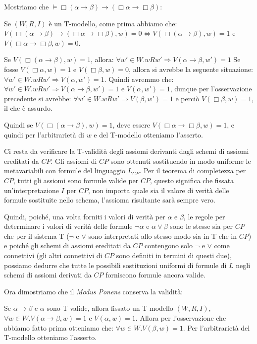 \documentclass[a4paper, titlepage, 12pt]{report}
\begin{document}
\begin{flushleft}
Mostriamo che $\vDash \Box (\alpha \rightarrow \beta) \rightarrow (\Box \alpha \rightarrow \Box \beta)$:

Se $(W, R, I)$ è un T-modello, come prima abbiamo che:
$V(\Box (\alpha \rightarrow \beta) \rightarrow (\Box \alpha \rightarrow \Box \beta), w) = 0
\Leftrightarrow V(\Box (\alpha \rightarrow \beta), w) = 1$ e $V(\Box \alpha \rightarrow \Box \beta, w) = 0$.

Se $V(\Box(\alpha \rightarrow \beta), w) = 1$, allora: $\forall w' \in W. wRw' \Rightarrow V(\alpha \rightarrow \beta, w') = 1$
Se fosse $V(\Box \alpha, w) = 1$ e $V(\Box \beta, w) = 0$, allora si avrebbe la seguente
situazione: $\forall w' \in W. wRw' \Rightarrow V(\alpha, w') = 1$. Quindi avremmo che:
$\forall w' \in W. wRw' \Rightarrow V(\alpha \rightarrow \beta, w') = 1$ e $V(\alpha, w') = 1$,
dunque per l'osservazione precedente si avrebbe: $\forall w' \in W. wRw' \Rightarrow V(\beta, w') = 1$
e perciò $V(\Box \beta, w) = 1$, il che è assurdo.

Quindi se $V(\Box(\alpha \rightarrow \beta), w) = 1$, deve essere $V(\Box \alpha \rightarrow \Box \beta, w) = 1$,
e quindi per l'arbitrarietà di $w$ e del T-modello otteniamo l'asserto.

Ci resta da verificare la T-validità degli assiomi derivanti dagli schemi di assiomi ereditati da $CP$.
Gli assiomi di $CP$ sono ottenuti sostituendo in modo uniforme le metavariabili con
formule del linguaggio $L_{CP}$.
Per il teorema di completezza per $CP$, tutti gli assiomi sono formule valide per $CP$,
questo significa che fissata un'interpretazione $I$ per $CP$,
non importa quale sia il valore di verità delle formule sostituite nello schema,
l'assioma risultante sarà sempre vero.

Quindi, poiché, una volta forniti i valori di verità per $\alpha$ e $\beta$,
le regole per determinare i valori di verità delle formule $\neg \alpha$ e $\alpha \lor \beta$
sono le stesse sia per $CP$ che per il sistema T
($\neg$ e $\lor$ sono interpretati allo stesso modo sia in T che in $CP$) e poiché
gli schemi di assiomi ereditati da $CP$ contengono solo $\neg$ e $\lor$ come connettivi
(gli altri connettivi di $CP$ sono definiti in termini di questi due),
possiamo dedurre che tutte le possibili sostituzioni uniformi di formule di $L$
negli schemi di assiomi derivati da $CP$ forniscono formule ancora valide.

Ora dimostriamo che il \textit{Modus Ponens} conserva la validità:

Se $\alpha \rightarrow \beta$ e $\alpha$ sono T-valide, allora fissato un T-modello $(W, R, I)$,
$\forall w \in W. V(\alpha \rightarrow \beta, w) = 1$ e $V(\alpha, w) = 1$.
Allora per l'osservazione che abbiamo fatto prima otteniamo che:
$\forall w \in W. V(\beta, w) = 1$. Per l'arbitrarietà del T-modello otteniamo l'asserto.


\end{flushleft}
\end{document}
